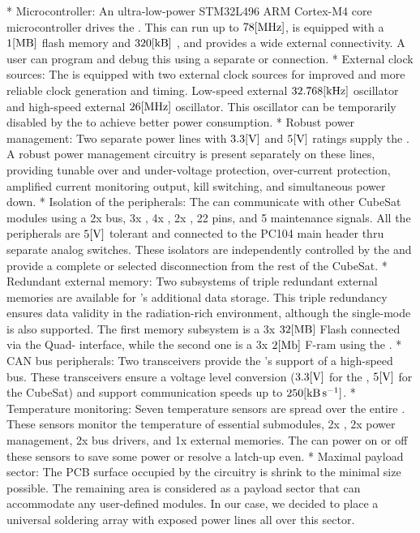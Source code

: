 \begitems
    * {\sbf Microcontroller:} An ultra-low-power STM32L496 ARM Cortex-M4 core microcontroller drives the . This  can run up to $78\rm{[MHz]}$, is equipped with a $1\rm{[MB]}$ flash memory and $320\rm{[kB]}$ , and provides a wide external connectivity. A user can program and debug this  using a separate  or  connection.
    * {\sbf External clock sources:} The  is equipped with two external clock sources for improved and more reliable clock generation and timing. Low-speed external $32.768\rm{[kHz]}$ oscillator and high-speed external $26\rm{[MHz]}$ oscillator. This oscillator can be temporarily disabled by the  to achieve better power consumption.
    * {\sbf Robust power management:} Two separate power lines with $3.3\rm{[V]}$ and $5\rm{[V]}$ ratings supply the . A robust power management circuitry is present separately on these lines, providing tunable over and under-voltage protection, over-current protection, amplified current monitoring output, kill switching, and simultaneous power down.
    * {\sbf Isolation of the peripherals:} The  can communicate with other CubeSat modules using a 2x  bus, 3x , 4x , 2x , 22  pins, and 5 maintenance signals. All the peripherals are $5\rm{[V]}$ tolerant and connected to the PC104 main header thru separate analog switches. These isolators are independently controlled by the  and provide a complete or selected disconnection from the rest of the CubeSat.
    * {\sbf Redundant external memory:} Two subsystems of triple redundant external memories are available for 's additional data storage. This triple redundancy ensures data validity in the radiation-rich environment, although the single-mode is also supported. The first memory subsystem is a 3x $32\rm{[MB]}$ Flash connected via the Quad- interface, while the second one is a 3x $2\rm{[Mb]}$ F-ram using the .
    * {\sbf CAN bus peripherals:} Two  transceivers provide the 's support of a high-speed  bus.  These transceivers ensure a voltage level conversion ($3.3\rm{[V]}$ for the , $5\rm{[V]}$ for the CubeSat) and support communication speeds up to $250\rm{[kB\,s^{-1}]}$.
    * {\sbf Temperature monitoring:} Seven  temperature sensors are spread over the entire . These sensors monitor the temperature of essential submodules, 2x , 2x power management, 2x  bus drivers, and 1x external memories. The  can power on or off these sensors to save some power or resolve a latch-up even.
    * {\sbf Maximal payload sector:} The PCB surface occupied by the  circuitry is shrink to the minimal size possible. The remaining area is considered as a payload sector that can accommodate any user-defined modules. In our case, we decided to place a universal soldering array with exposed power lines all over this sector.
\enditems



